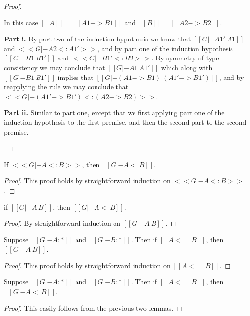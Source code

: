 \begin{proof}
\begin{itemize}
    In this case $[[A]] = [[A1 -> B1]]$ and $[[B]] = [[A2 -> B2]]$.

    \noindent
    \textbf{Part i.} By part two of the induction hypothesis we know
    that $[[G |- A1' ~ A1]]$ and $<<G |- A2 <: A1'>>$, and by part one of the induction hypothesis
    $[[G |- B1 ~ B1']]$ and $<<G |- B1' <: B2>>$.  By symmetry of type consistency
    we may conclude that $[[G |- A1 ~ A1']]$ which along with $[[G |- B1 ~ B1']]$
    implies that $[[G |- (A1 -> B1) ~ (A1' -> B1')]]$, and by reapplying the rule
    we may conclude that $<<G |- (A1' -> B1') <: (A2 -> B2)>>$.

    \noindent
    \textbf{Part ii.} Similar to part one, except that we first
    applying part one of the induction hypothesis to the first
    premise, and then the second part to the second premise.
    
  \end{itemize}

\end{proof}

\begin{lemma}
  \label{lemma:consistent-subtyping-2}
  If $<<G |- A <: B>>$, then $[[G |- A <~ B]]$.
\end{lemma}
\begin{proof}
  This proof holds by straightforward induction on $<<G |- A <: B>>$.
\end{proof}

\begin{lemma}
  \label{lemma:consistent-subtyping-3}
  if $[[G |- A ~ B]]$, then $[[G |- A <~ B]]$.
\end{lemma}
\begin{proof}
  By straightforward induction on $[[G |- A ~ B]]$.
\end{proof}

\begin{lemma}
  \label{lemma:type_precision_and_consistency}
  Suppose $[[G |- A : *]]$ and $[[G |- B : *]]$.  Then
  if $[[A <= B]]$, then $[[G |- A ~ B]]$.
\end{lemma}
\begin{proof}
  This proof holds by straightforward induction on $[[A <= B]]$.
\end{proof}

\begin{corollary}
  \label{corollary:type_precision_and_subtyping}
  Suppose $[[G |- A : *]]$ and $[[G |- B : *]]$.  Then
  if $[[A <= B]]$, then $[[G |- A <~ B]]$.
\end{corollary}
\begin{proof}
  This easily follows from the previous two lemmas.
\end{proof}

